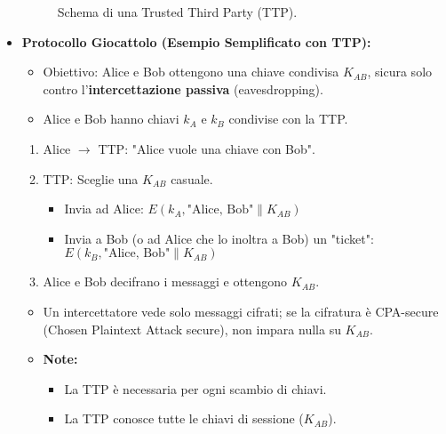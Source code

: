 \begin{itemize}
\begin{figure}[H]
            \caption{Schema di una Trusted Third Party (TTP).}
            \label{fig:ttp_schema}
        \end{figure}
    \item \textbf{Protocollo Giocattolo (Esempio Semplificato con TTP):}
        \begin{itemize}
            \item Obiettivo: Alice e Bob ottengono una chiave condivisa $K_{AB}$, sicura solo contro l'\textbf{intercettazione passiva} (eavesdropping).
            \item Alice e Bob hanno chiavi $k_A$ e $k_B$ condivise con la TTP.
        \end{itemize}
        \begin{enumerate}
            \item Alice $\rightarrow$ TTP: "Alice vuole una chiave con Bob".
            \item TTP: Sceglie una $K_{AB}$ casuale.
                \begin{itemize}
                    \item Invia ad Alice: $E(k_A, \text{"Alice, Bob"} \parallel K_{AB})$
                    \item Invia a Bob (o ad Alice che lo inoltra a Bob) un "ticket": $E(k_B, \text{"Alice, Bob"} \parallel K_{AB})$
                \end{itemize}
            \item Alice e Bob decifrano i messaggi e ottengono $K_{AB}$.
        \end{enumerate}
        \begin{itemize}
            \item Un intercettatore vede solo messaggi cifrati; se la cifratura è CPA-secure (Chosen Plaintext Attack secure), non impara nulla su $K_{AB}$.
            \item \textbf{Note:}
                \begin{itemize}
                    \item La TTP è necessaria per ogni scambio di chiavi.
                    \item La TTP conosce tutte le chiavi di sessione ($K_{AB}$).

\end{itemize}
\end{itemize}
\end{itemize}

